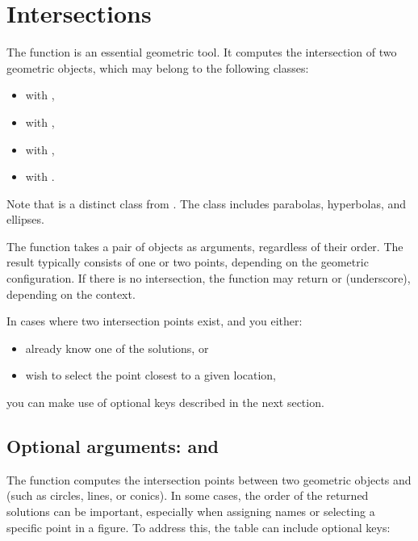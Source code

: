 \newpage
\section{Intersections} %
\label{sec:intersections}

The  function is an essential geometric tool. It computes the intersection of two geometric objects, which may belong to the following classes:

\begin{itemize}
  \item {} with ,
  \item {} with ,
  \item {} with ,
  \item {} with .
\end{itemize}

\noindent
Note that  is a distinct class from . The  class includes parabolas, hyperbolas, and ellipses.

\medskip
\noindent
The function takes a pair of objects as arguments, regardless of their order. The result typically consists of one or two points, depending on the geometric configuration. If there is no intersection, the function may return  or \code{\_} (underscore), depending on the context.

\medskip
\noindent
In cases where two intersection points exist, and you either:
\begin{itemize}
  \item already know one of the solutions, or
  \item wish to select the point closest to a given location,
\end{itemize}
you can make use of optional keys described in the next section.

\subsection{Optional arguments:  and } %
\label{sub:intersection_known_near}

The function  computes the intersection points between two geometric objects  and  (such as circles, lines, or conics). In some cases, the order of the returned solutions can be important, especially when assigning names or selecting a specific point in a figure. To address this, the  table can include optional keys:

